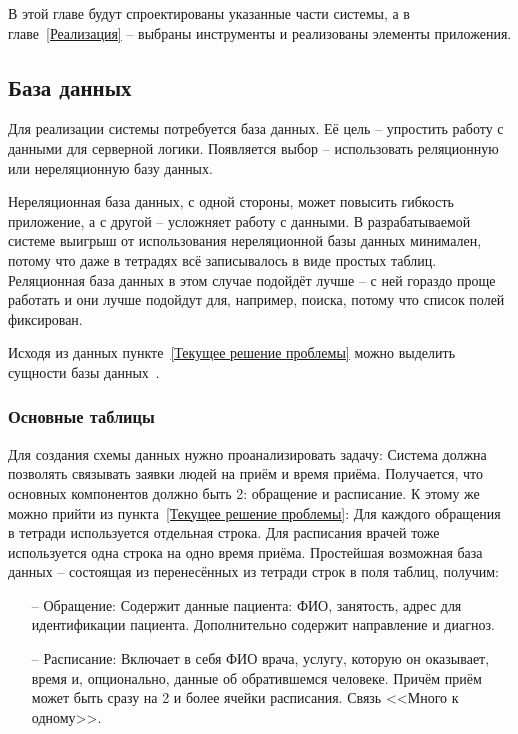\documentclass[a4paper,article]{article}
\begin{document}
\begin{sloppypar}
    В этой главе будут спроектированы указанные части системы, а в главе~\ref{Реализация} -- выбраны инструменты и реализованы элементы приложения.

    \subsection{База данных}

    Для реализации системы потребуется база данных. Её цель -- упростить работу с данными для серверной логики. Появляется выбор -- использовать реляционную или нереляционную базу данных.

    Нереляционная база данных, с одной стороны, может повысить гибкость приложение, а с другой -- усложняет работу с данными. В разрабатываемой системе выигрыш от использования нереляционной базы данных минимален, потому что даже в тетрадях всё записывалось в виде простых таблиц. Реляционная база данных в этом случае подойдёт лучше -- с ней гораздо проще работать и они лучше подойдут для, например, поиска, потому что список полей фиксирован.

    Исходя из данных пункте~\ref{Текущее решение проблемы} можно выделить сущности базы данных~\cite{dbdesign}.

    \subsubsection{Основные таблицы}\label{Проектирование БД. Основные компоненты}

    Для создания схемы данных нужно проанализировать задачу: Система должна позволять связывать заявки людей на приём и время приёма. Получается, что основных компонентов должно быть 2: обращение и расписание. К этому же можно прийти из пункта~\ref{Текущее решение проблемы}: Для каждого обращения в тетради используется отдельная строка. Для расписания врачей тоже используется одна строка на одно время приёма. Простейшая возможная база данных -- состоящая из перенесённых из тетради строк в поля таблиц, получим:

    \begin{itemize}[nolistsep]
        \item[--] Обращение: Содержит данные пациента: ФИО, занятость, адрес для идентификации пациента. Дополнительно содержит направление и диагноз.
        \item[--] Расписание: Включает в себя ФИО врача, услугу, которую он оказывает, время и, опционально, данные об обратившемся человеке. Причём приём может быть сразу на 2 и более ячейки расписания. Связь <<Много к одному>>.
    \end{itemize}


\end{sloppypar}
\end{document}
